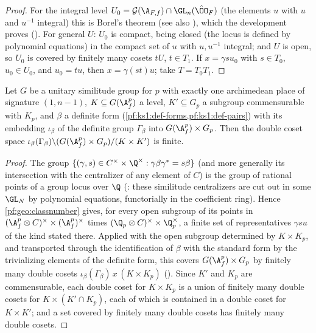 \begin{proof}
For the integral level $U_0=\mathcal G(\A_{F,f})\cap\GL_n(\hat\OO_F)$ (the elements $u$ with $u$ and $u^{-1}$ integral)
this is Borel's theorem \cite[Thm.~5.1]{Borel1963} (see also \cite[\S5.1]{PlatonovRapinchuk1994}), which
the development proves (). For
general $U$: $U_0$ is compact, being closed (the locus is defined by polynomial equations) in the compact set
of $u$ with $u,u^{-1}$ integral; and $U$ is open, so $U_0$ is covered by finitely many cosets $tU$, $t\in T_1$. If
$x=\gamma su_0$ with $s\in T_0$, $u_0\in U_0$, and $u_0=tu$, then $x=\gamma(st)u$; take $T=T_0T_1$.
\end{proof}

\begin{corollary}\label{pf:geo:defclassfin}
Let $G$ be a unitary similitude group for $p$ with exactly one archimedean place of signature $(1,n-1)$,
$K\subseteq G(\A_f^p)$ a level, $K'\subseteq G_p$ a subgroup commensurable with $K_p$, and $\beta$ a definite form
(\cref{pf:ks1:def-forms,pf:ks1:def-pairs}) with its embedding $\iota_\beta$ of the definite group $\Gamma_\beta$ into
$G(\A_f^p)\times G_p$. Then the double coset space $\iota_\beta(\Gamma_\beta)\backslash(G(\A_f^p)\times G_p)/(K\times K')$ is
finite.
\end{corollary}

\begin{proof}
The group $\{(\gamma,s)\in C^\times\times\Q^\times:\gamma\beta\gamma^*=s\beta\}$ (and more generally its intersection with the
centralizer of any element of $C$) is the group of rational points of a group locus over $\Q$
(: these similitude centralizers are
cut out in some $\GL_N$ by polynomial equations, functorially in the coefficient ring). Hence
\cref{pf:geo:classnumber} gives, for every open subgroup of its points in
$(\A_f^p\otimes C)^\times\times(\A_f^p)^\times$ times $(\Q_p\otimes C)^\times\times\Q_p^\times$, a finite set of representatives
$\gamma s u$ of the kind stated there. Applied with the open subgroup determined by $K\times K_p$, and transported through
the identification of $\beta$ with the standard form by the trivializing elements of the definite form, this covers
$G(\A_f^p)\times G_p$ by finitely many double cosets $\iota_\beta(\Gamma_\beta)\,x\,(K\times K_p)$
(). Since $K'$ and $K_p$ are commensurable, each double coset for
$K\times K_p$ is a union of finitely many double cosets for $K\times(K'\cap K_p)$, each of which is contained in a double
coset for $K\times K'$; and a set covered by finitely many double cosets has finitely many double cosets.
\end{proof}

